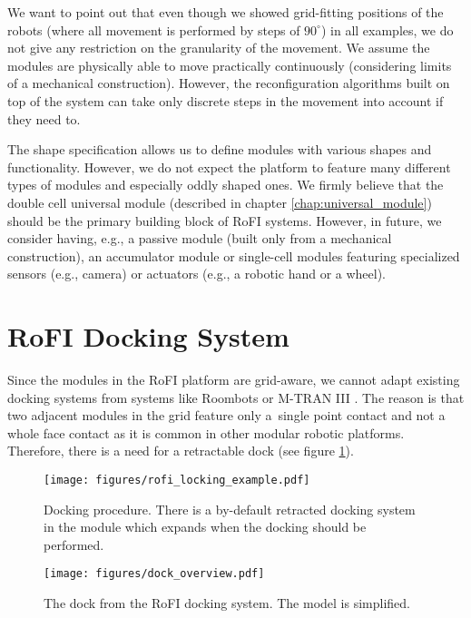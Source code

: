 We want to point out that even though we showed grid-fitting positions of the
robots (where all movement is performed by steps of $90^\circ$) in all examples,
we do not give any restriction on the granularity of the movement. We assume the
modules are physically able to move practically continuously (considering limits
of a mechanical construction). However, the reconfiguration algorithms built on
top of the system can take only discrete steps in the movement into account if
they need to.

The shape specification allows us to define modules with various shapes and
functionality. However, we do not expect the platform to feature many different
types of modules and especially oddly shaped ones. We firmly believe that the
double cell universal module (described in chapter \ref{chap:universal_module})
should be the primary building block of RoFI systems. However, in future, we
consider having, e.g., a passive module (built only from a mechanical
construction), an accumulator module or single-cell modules featuring
specialized sensors (e.g., camera) or actuators (e.g., a robotic hand or a
wheel).

\section{RoFI Docking System}\label{sec:dock}

Since the modules in the RoFI platform are grid-aware, we cannot adapt existing
docking systems from systems like Roombots \cite{bonardi_locomotion_2012} or
M-TRAN III \cite{kurokawa_distributed_2008}. The reason is that two adjacent
modules in the grid feature only a~single point contact and not a whole face
contact as it is common in other modular robotic platforms. Therefore, there is
a need for a retractable dock (see figure \ref{fig:rofi_locking_example}).

\begin{figure}[t]
    \centering
    \texttt{[image: figures/rofi\_locking\_example.pdf]}
    \caption{Docking procedure. There is a by-default retracted docking system
    in the module which expands when the docking should be performed.}
    \label{fig:rofi_locking_example}
\end{figure}


\begin{figure}[t]
    \centering
    \texttt{[image: figures/dock\_overview.pdf]}
    \caption{The dock from the RoFI docking system. The model is simplified.}
    \label{fig:dock_overview}
\end{figure}

